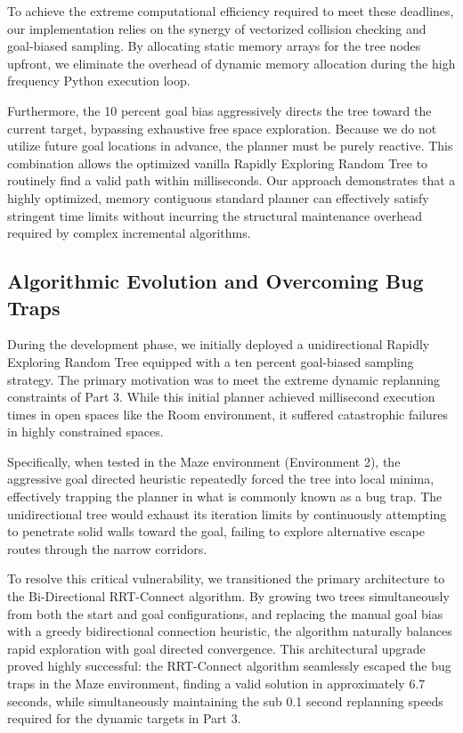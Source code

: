 \documentclass[letterpaper,journal]{IEEEtran}
\begin{document}
To achieve the extreme computational efficiency required to meet these deadlines, our implementation relies on the synergy of vectorized collision checking and goal-biased sampling. By allocating static memory arrays for the tree nodes upfront, we eliminate the overhead of dynamic memory allocation during the high frequency Python execution loop.

Furthermore, the 10 percent goal bias aggressively directs the tree toward the current target, bypassing exhaustive free space exploration. Because we do not utilize future goal locations in advance, the planner must be purely reactive. This combination allows the optimized vanilla Rapidly Exploring Random Tree to routinely find a valid path within milliseconds. Our approach demonstrates that a highly optimized, memory contiguous standard planner can effectively satisfy stringent time limits without incurring the structural maintenance overhead required by complex incremental algorithms.

\subsection{Algorithmic Evolution and Overcoming Bug Traps}
During the development phase, we initially deployed a unidirectional Rapidly Exploring Random Tree equipped with a ten percent goal-biased sampling strategy. The primary motivation was to meet the extreme dynamic replanning constraints of Part 3. While this initial planner achieved millisecond execution times in open spaces like the Room environment, it suffered catastrophic failures in highly constrained spaces.

Specifically, when tested in the Maze environment (Environment 2), the aggressive goal directed heuristic repeatedly forced the tree into local minima, effectively trapping the planner in what is commonly known as a bug trap. The unidirectional tree would exhaust its iteration limits by continuously attempting to penetrate solid walls toward the goal, failing to explore alternative escape routes through the narrow corridors.

To resolve this critical vulnerability, we transitioned the primary architecture to the Bi-Directional RRT-Connect algorithm. By growing two trees simultaneously from both the start and goal configurations, and replacing the manual goal bias with a greedy bidirectional connection heuristic, the algorithm naturally balances rapid exploration with goal directed convergence. This architectural upgrade proved highly successful: the RRT-Connect algorithm seamlessly escaped the bug traps in the Maze environment, finding a valid solution in approximately 6.7 seconds, while simultaneously maintaining the sub 0.1 second replanning speeds required for the dynamic targets in Part 3.
\end{document}
